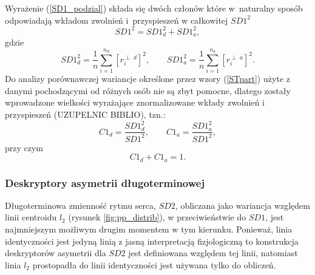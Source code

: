 Wyrażenie (\ref{SD1_podzial}) składa się dwóch członów które w~naturalny sposób odpowiadają
wkładom zwolnień i~przyspieszeń w całkowitej $SD1^{2}$ 
\begin{equation}
SD1^{2}=SD1_{d}^{2}+SD1_{a}^{2}\label{SD1par},
\end{equation}
gdzie
\begin{equation}
SD1_{d}^{2}=\frac{1}{n}\sum_{i=1}^{n_{d}}[r^{\perp\;d}_{i}]^{2}, \qquad SD1_{a}^{2}=\frac{1}{n}\sum_{i=1}^{n_{a}}[r^{\perp\;a}_{i}]^{2}. \label{STpart}
\end{equation}
Do analizy porównawczej wariancje określone przez wzory (\ref{STpart}) użyte z danymi
pochodzącymi od różnych osób nie są zbyt pomocne, dlatego zostały wprowadzone wielkości
wyrażające znormalizowane wkłady zwolnień i przyspieszeń (UZUPELNIC BIBLIO), tzn.:
\begin{equation}
C1_{d}=\frac{SD1_{d}^{2}}{SD1^{2}}, \qquad C1_{a}=\frac{SD1_{a}^{2}}{SD1^{2}},\label{STnorm}
\end{equation}
przy czym
\begin{equation}
C1_{d}+C1_{a}=1.
\end{equation}

\subsubsection{Deskryptory asymetrii długoterminowej}

Długoterminowa zmienność rytmu serca, $SD2$, obliczana jako wariancja względem linii
centroidu $l_2$ (rysunek \ref{fig:pp_distrib}), w przeciwieństwie do $SD1$, jest
najmniejszym możliwym drugim momentem w tym kierunku. Ponieważ, linia identyczności jest
jedyną linią z jasną interpretacją fizjologiczną to konstrukcja deskryptorów asymetrii dla
$SD2$ jest definiowana względem tej linii, natomiast linia $l_2$ prostopadła do linii
identyczności jest używana tylko do obliczeń.

